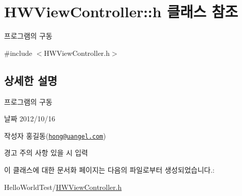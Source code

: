 \hypertarget{class_h_w_view_controller_1_1h}{\section{H\-W\-View\-Controller\-:\-:h 클래스 참조}
\label{class_h_w_view_controller_1_1h}
}


프로그램의 구동  




{\ttfamily \#include $<$H\-W\-View\-Controller.\-h$>$}



\subsection{상세한 설명}
프로그램의 구동 

\begin{DoxyDate}{날짜}
2012/10/16 
\end{DoxyDate}
\begin{DoxyAuthor}{작성자}
홍길동(\href{mailto:hong@uangel.com}{\tt hong@uangel.\-com}) 
\end{DoxyAuthor}
\begin{DoxyWarning}{경고}
주의 사항 있을 시 입력 
\end{DoxyWarning}


이 클래스에 대한 문서화 페이지는 다음의 파일로부터 생성되었습니다.\-:\begin{DoxyCompactItemize}
\item 
Hello\-World\-Test/\hyperlink{_h_w_view_controller_8h}{H\-W\-View\-Controller.\-h}\end{DoxyCompactItemize}
